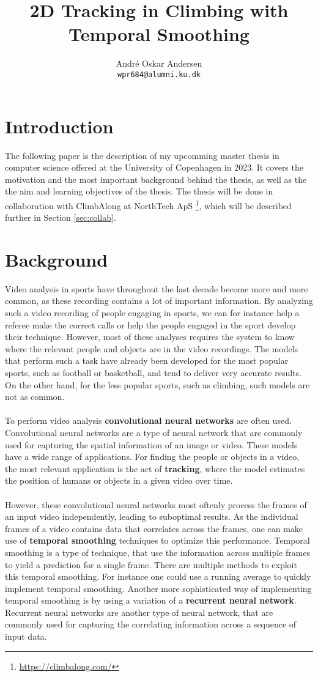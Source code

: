 \documentclass[11pt]{article}
\title{2D Tracking in Climbing with Temporal Smoothing}
\author{André Oskar Andersen \\
  \texttt{wpr684@alumni.ku.dk} \\}
\date{}
\begin{document}
\maketitle

\section{Introduction}
The following paper is the description of my upcomming master thesis in computer science offered at the University of Copenhagen in 2023. It covers the motivation and the most important background behind the thesis, as well as the the aim and learning objectives of the thesis. The thesis will be done in collaboration with ClimbAlong at NorthTech ApS \footnote{\url{https://climbalong.com/}}, which will be described further in Section \ref{sec:collab}.

\section{Background}
Video analysis in sports have throughout the last decade become more and more common, as these recording contains a lot of important information. By analyzing such a video recording of people engaging in sports, we can for instance help a referee make the correct calls or help the people engaged in the sport develop their technique. However, most of these analyses requires the system to know where the relevant people and objects are in the video recordings. The models that perform such a task have already been developed for the most popular sports, such as football or basketball, and tend to deliver very accurate results. On the other hand, for the less popular sports, such as climbing, such models are not as common.
\\
\\
To perform video analysis \textbf{convolutional neural networks} are often used. Convolutional neural networks are a type of neural network that are commonly used for capturing the spatial information of an image or video. These models have a wide range of applications. For finding the people or objects in a video, the most relevant application is the act of \textbf{tracking}, where the model estimates the position of humans or objects in a given video over time.
\\
\\
However, these convolutional neural networks most oftenly process the frames of an input video independently, leading to suboptimal results. As the individual frames of a video contains data that correlates across the frames, one can make use of \textbf{temporal smoothing} techniques to optimize this performance. Temporal smoothing is a type of technique, that use the information across multiple frames to yield a prediction for a single frame. There are multiple methods to exploit this temporal smoothing. For instance one could use a running average to quickly implement temporal smoothing. Another more sophisticated way of implementing temporal smoothing is by using a variation of a \textbf{recurrent neural network}. Recurrent neural networks are another type of neural network, that are commonly used for capturing the correlating information across a sequence of input data.
\end{document}
